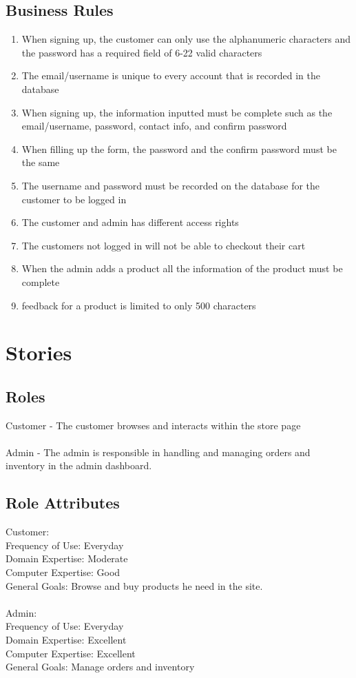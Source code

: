 \documentclass{report}
\begin{document}
\section{Business Rules}
\begin{enumerate}
\item When signing up, the customer can only use the alphanumeric characters and the password has a required field of 6-22 valid characters
\item The email/username is unique to every account that is recorded in the database
\item When signing up, the information inputted must be complete such as the email/username, password, contact info, and confirm password
\item When filling up the form, the password and the confirm password must be the same
\item The username and password must be recorded on the database for the customer to be logged in
\item The customer and admin has different access rights
\item The customers not logged in will not be able to checkout their cart
\item When the admin adds a product all the information of the product must be complete
\item feedback for a product is limited to only 500 characters
\end{enumerate}

\chapter{Stories}
\section{Roles}
Customer - The customer browses and interacts within the store page \\ \\
Admin - The admin is responsible in handling and managing orders and inventory in the admin dashboard. 

\section{Role Attributes}
Customer: \\
Frequency of Use: Everyday \\
Domain Expertise: Moderate \\
Computer Expertise: Good \\
General Goals: Browse and buy products he need in the site. \\ \\
Admin: \\
Frequency of Use: Everyday \\
Domain Expertise: Excellent \\
Computer Expertise: Excellent \\
General Goals: Manage orders and inventory \\
\end{document}
